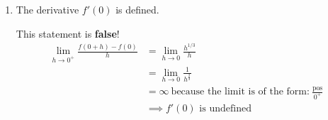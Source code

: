 \documentclass[nooutcomes]{ximera}
\begin{document}
\begin{problem}
\begin{enumerate}
    \item  The derivative $f'(0)$ is defined.
      \begin{freeResponse}
        This statement is \textbf{false}!
        \begin{align*}
          \lim_{h \to 0^+} \frac{f(0  + h) - f(0)}{h}
          &= \lim_{h \to 0} \frac{h^{1/3}}{h} \\
          &= \lim_{h \to 0} \frac{1}{h^{\frac{2}{3}}} \\	
          &= \infty\ \text{because the limit is of the form:}\ \frac{\text{pos}}{0^+}\\
          &\implies \mbox{$f'(0)$ is undefined}
        \end{align*}
      \end{freeResponse}
  \end{enumerate}
\end{problem}	
	
\end{document}
